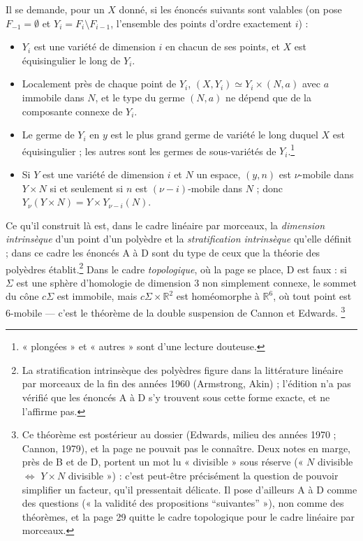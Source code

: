 \documentclass[11pt,a4paper]{article}
\begin{document}
Il se demande, pour un $X$ donné, si les énoncés suivants sont valables (on
pose $F_{-1} = \emptyset$ et $Y_i = F_i \setminus F_{i-1}$, l'ensemble des
points d'ordre exactement $i$) :

\begin{itemize}
\item[A.] $Y_i$ est une variété de dimension $i$ en chacun de ses points, et
  $X$ est équisingulier le long de $Y_i$.
\item[B.] Localement près de chaque point de $Y_i$, $(X, Y_i) \simeq
  Y_i \times (N, a)$ avec $a$ immobile dans $N$, et le type du germe $(N, a)$ ne
  dépend que de la composante connexe de $Y_i$.
\item[C.] Le germe de $Y_i$ en $y$ est le plus grand germe de variété le long
  duquel $X$ est équisingulier ; les autres sont les germes de sous-variétés de
  $Y_i$.\footnote{« plongées » et « autres » sont d'une lecture douteuse.}
\item[D.] Si $Y$ est une variété de dimension $i$ et $N$ un espace, $(y, n)$
  est $\nu$-mobile dans $Y \times N$ si et seulement si $n$ est $(\nu -
  i)$-mobile dans $N$ ; donc $Y_\nu(Y \times N) = Y \times Y_{\nu-i}(N)$.
\end{itemize}

Ce qu'il construit là est, dans le cadre linéaire par morceaux, la
\emph{dimension intrinsèque} d'un point d'un polyèdre et la
\emph{stratification intrinsèque} qu'elle définit ; dans ce cadre les énoncés
A à D sont du type de ceux que la théorie des polyèdres établit.\footnote{La
stratification intrinsèque des polyèdres figure dans la littérature linéaire
par morceaux de la fin des années 1960 (Armstrong, Akin) ; l'édition n'a pas
vérifié que les énoncés A à D s'y trouvent sous cette forme exacte, et ne
l'affirme pas.} Dans le cadre \emph{topologique}, où la page se place, D est
faux : si $\Sigma$ est une sphère d'homologie de dimension 3 non simplement
connexe, le sommet du cône $c\Sigma$ est immobile, mais $c\Sigma \times
\mathbb{R}^2$ est homéomorphe à $\mathbb{R}^6$, où tout point est
$6$-mobile — c'est le théorème de la double suspension de Cannon et Edwards.
\footnote{Ce théorème est postérieur au dossier (Edwards, milieu des années
1970 ; Cannon, 1979), et la page ne pouvait pas le connaître. Deux notes en
marge, près de B et de D, portent un mot lu « divisible » sous réserve
(« $N$ divisible $\Leftrightarrow$ $Y \times N$ divisible ») : c'est
peut-être précisément la question de pouvoir simplifier un facteur, qu'il
pressentait délicate. Il pose d'ailleurs A à D comme des questions
(« la validité des propositions “suivantes” »), non comme des théorèmes, et la
page 29 quitte le cadre topologique pour le cadre linéaire par morceaux.}
\end{document}
